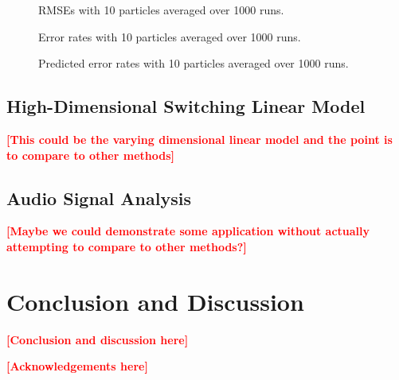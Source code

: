 \documentclass[twocolumn]{autart}    %
\newcommand{\comment}[1]{\textcolor{red}{\textbf{[#1]}}}
\begin{document}
\begin{figure}[htb]
\begin{center}
\end{center}
\caption{RMSEs with 10 particles averaged over 1000 runs.}
\label{fig:10_rmse}
\end{figure}

\begin{figure}[htb]
\begin{center}
\end{center}
\caption{Error rates with 10 particles averaged over 1000 runs.}
\label{fig:10_err}
\end{figure}

\begin{figure}[htb]
\begin{center}
\end{center}
\caption{Predicted error rates with 10 particles averaged over 1000
  runs.}
\label{fig:10_errp}
\end{figure}


\subsection{High-Dimensional Switching Linear Model}

\comment{This could be the varying dimensional linear model and the
point is to compare to other methods}

\subsection{Audio Signal Analysis}

\comment{Maybe we could demonstrate some application without actually
attempting to compare to other methods?}


\section{Conclusion and Discussion}

\comment{Conclusion and discussion here}



\begin{ack}                               %
\comment{Acknowledgements here}
\end{ack}
\end{document}
